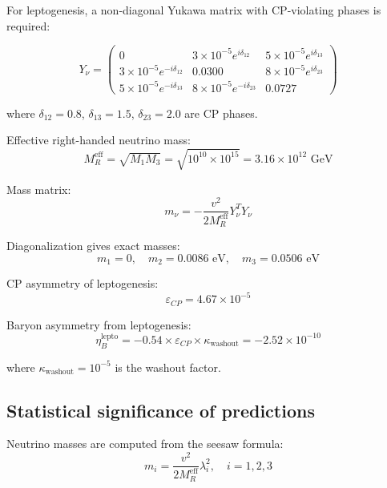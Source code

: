 \documentclass[12pt,a4paper,twoside]{article}
\theoremstyle{definition}
\begin{document}
For leptogenesis, a non-diagonal Yukawa matrix with CP-violating phases is required:

\begin{equation}
Y_\nu = \begin{pmatrix}
0 & 3\times10^{-5}e^{i\delta_{12}} & 5\times10^{-5}e^{i\delta_{13}} \\
3\times10^{-5}e^{-i\delta_{12}} & 0.0300 & 8\times10^{-5}e^{i\delta_{23}} \\
5\times10^{-5}e^{-i\delta_{13}} & 8\times10^{-5}e^{-i\delta_{23}} & 0.0727
\end{pmatrix}
\label{eq:yukawa_cp}
\end{equation}

where $\delta_{12} = 0.8$, $\delta_{13} = 1.5$, $\delta_{23} = 2.0$ are CP phases.

Effective right-handed neutrino mass:
\begin{equation}
M_R^{\text{eff}} = \sqrt{M_1 M_3} = \sqrt{10^{10} \times 10^{15}} = 3.16 \times 10^{12} \text{ GeV}
\end{equation}

Mass matrix:
\begin{equation}
m_\nu = -\frac{v^2}{2M_R^{\text{eff}}} Y_\nu^T Y_\nu
\end{equation}

Diagonalization gives exact masses:
\begin{equation}
\boxed{
m_1 = 0, \quad m_2 = 0.0086 \text{ eV}, \quad m_3 = 0.0506 \text{ eV}
}
\end{equation}

CP asymmetry of leptogenesis:
\begin{equation}
\varepsilon_{CP} = 4.67 \times 10^{-5}
\end{equation}

Baryon asymmetry from leptogenesis:
\begin{equation}
\eta_B^{\text{lepto}} = -0.54 \times \varepsilon_{CP} \times \kappa_{\text{washout}} = -2.52 \times 10^{-10}
\end{equation}

where $\kappa_{\text{washout}} = 10^{-5}$ is the washout factor.

\subsection{Statistical significance of predictions}
\label{sec:statistical}

Neutrino masses are computed from the seesaw formula:
\begin{equation}
m_i = \frac{v^2}{2M_R^{\text{eff}}} \lambda_i^2, \quad i = 1,2,3
\label{eq:seesaw_masses}
\end{equation}
\end{document}

